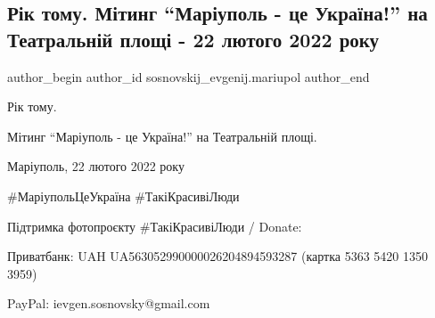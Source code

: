  
 
 
 
 

\subsection{Рік тому. Мітинг \enquote{Маріуполь - це Україна!} на Театральній площі - 22 лютого 2022 року}
\label{sec:22_02_2023.fb.sosnovskij_evgenij.mariupol.1.r_k_tomu__m_ting__ma}

\ifcmt
 author_begin
   author_id sosnovskij_evgenij.mariupol
 author_end
\fi

Рік тому.

Мітинг \enquote{Маріуполь - це Україна!} на Театральній площі.

Маріуполь, 22 лютого 2022 року 

\#МаріупольЦеУкраїна \#ТакіКрасивіЛюди

Підтримка фотопроєкту \#ТакіКрасивіЛюди / Donate: 

Приватбанк: UAH UA563052990000026204894593287 (картка 5363 5420 1350 3959) 

PayPal: ievgen.sosnovsky@gmail.com
